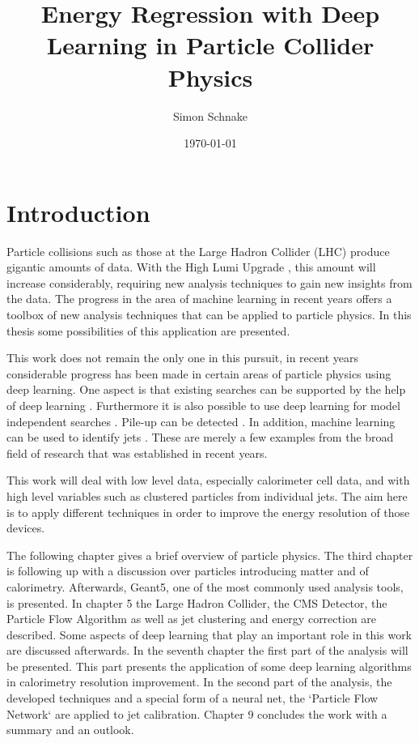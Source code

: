 \documentclass[12pt, a4paper]{thesis}
\author{Simon Schnake}
\date{\today}
\title{Energy Regression with Deep Learning in Particle Collider Physics}
\begin{document}


\tableofcontents
\cleardoublepage

\chapter{Introduction}
\label{sec:org1373fac}

Particle collisions such as those at the Large Hadron Collider (LHC)
\cite{lhc_machine} produce gigantic amounts of data. With the High
Lumi Upgrade \cite{bruening19_high_lumin_large_hadron_collid}, this
amount will increase considerably, requiring new analysis
techniques to gain new insights from the data. The progress in the
area of machine learning in recent years offers a toolbox of new
analysis techniques that can be applied to particle physics. In this
thesis some possibilities of this application are presented.

This work does not remain the only one in this pursuit, in recent
years considerable progress has been made in certain areas of particle
physics using deep learning. One aspect is that existing searches can
be supported by the help of deep learning
\cite{baldi14_searc_exotic_partic_high_energ,baldi15_enhan_higgs_boson_to_with_deep_learn,santos17_machin_learn_techn_searc_decay_chann}.
Furthermore it is also possible to use deep learning for model
independent searches
\cite{dagnolo19_learn_new_physic_from_machin,simone19_guidin_new_physic_searc_with_unsup_learn,heimel19_qcd_or_what}.
Pile-up can be detected
\cite{komiske17_pileup_mitig_with_machin_learn_pumml}.  In addition,
machine learning can be used to identify jets
\cite{komiske19_energ_flow_networ,cogan15_jet_images,oliveira16_jet_images_deep_learn_edition,baldi16_jet_subst_class_high_energ,barnard17_parton_shower_uncer_jet_subst,kasieczka17_deep_learn_top_tagger_or_end_qcd,datta17_how_much_infor_is_jet,komiske17_deep_learn_color}.
These are merely a few examples from the broad field of research that
was established in recent years.

This work will deal with low level data, especially calorimeter cell
data, and with high level variables such as clustered particles from
individual jets.  The aim here is to apply different techniques in
order to improve the energy resolution of those devices.

The following chapter gives a brief overview of particle physics. The
third chapter is following up with a discussion over particles
introducing matter and of calorimetry. Afterwards, Geant5, one of the
most commonly used analysis tools, is presented. In chapter 5 the
Large Hadron Collider, the CMS Detector, the Particle Flow Algorithm
as well as jet clustering and energy correction are described. Some
aspects of deep learning that play an important role in this work are
discussed afterwards. In the seventh chapter the first part of the
analysis will be presented. This part presents the application of some
deep learning algorithms in calorimetry resolution improvement. In the
second part of the analysis, the developed techniques and a special
form of a neural net, the `Particle Flow Network` are applied to jet
calibration. Chapter 9 concludes the work with a summary and an
outlook.
\end{document}
